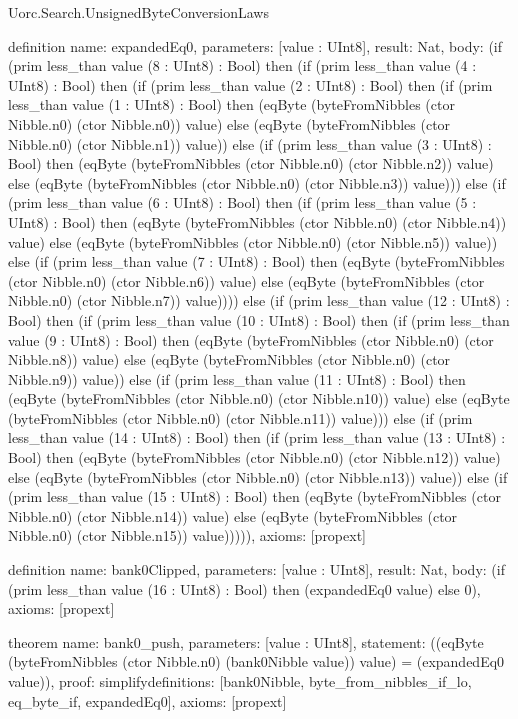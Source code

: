 \begin{lexlean}{Uorc.Search.UnsignedByteConversionLaws}
\begin{semanticmodule}
definition{
  name: expandedEq0,
  parameters: [value : UInt8],
  result: Nat,
  body: (if (prim less_than value (8 : UInt8) : Bool) then (if (prim less_than value (4 : UInt8) : Bool) then (if (prim less_than value (2 : UInt8) : Bool) then (if (prim less_than value (1 : UInt8) : Bool) then (eqByte (byteFromNibbles (ctor Nibble.n0) (ctor Nibble.n0)) value) else (eqByte (byteFromNibbles (ctor Nibble.n0) (ctor Nibble.n1)) value)) else (if (prim less_than value (3 : UInt8) : Bool) then (eqByte (byteFromNibbles (ctor Nibble.n0) (ctor Nibble.n2)) value) else (eqByte (byteFromNibbles (ctor Nibble.n0) (ctor Nibble.n3)) value))) else (if (prim less_than value (6 : UInt8) : Bool) then (if (prim less_than value (5 : UInt8) : Bool) then (eqByte (byteFromNibbles (ctor Nibble.n0) (ctor Nibble.n4)) value) else (eqByte (byteFromNibbles (ctor Nibble.n0) (ctor Nibble.n5)) value)) else (if (prim less_than value (7 : UInt8) : Bool) then (eqByte (byteFromNibbles (ctor Nibble.n0) (ctor Nibble.n6)) value) else (eqByte (byteFromNibbles (ctor Nibble.n0) (ctor Nibble.n7)) value)))) else (if (prim less_than value (12 : UInt8) : Bool) then (if (prim less_than value (10 : UInt8) : Bool) then (if (prim less_than value (9 : UInt8) : Bool) then (eqByte (byteFromNibbles (ctor Nibble.n0) (ctor Nibble.n8)) value) else (eqByte (byteFromNibbles (ctor Nibble.n0) (ctor Nibble.n9)) value)) else (if (prim less_than value (11 : UInt8) : Bool) then (eqByte (byteFromNibbles (ctor Nibble.n0) (ctor Nibble.n10)) value) else (eqByte (byteFromNibbles (ctor Nibble.n0) (ctor Nibble.n11)) value))) else (if (prim less_than value (14 : UInt8) : Bool) then (if (prim less_than value (13 : UInt8) : Bool) then (eqByte (byteFromNibbles (ctor Nibble.n0) (ctor Nibble.n12)) value) else (eqByte (byteFromNibbles (ctor Nibble.n0) (ctor Nibble.n13)) value)) else (if (prim less_than value (15 : UInt8) : Bool) then (eqByte (byteFromNibbles (ctor Nibble.n0) (ctor Nibble.n14)) value) else (eqByte (byteFromNibbles (ctor Nibble.n0) (ctor Nibble.n15)) value))))),
  axioms: [propext]
}

definition{
  name: bank0Clipped,
  parameters: [value : UInt8],
  result: Nat,
  body: (if (prim less_than value (16 : UInt8) : Bool) then (expandedEq0 value) else 0),
  axioms: [propext]
}

theorem{
  name: bank0_push,
  parameters: [value : UInt8],
  statement: ((eqByte (byteFromNibbles (ctor Nibble.n0) (bank0Nibble value)) value) = (expandedEq0 value)),
  proof: simplify{definitions: [bank0Nibble, byte_from_nibbles_if_lo, eq_byte_if, expandedEq0]},
  axioms: [propext]
}


\end{semanticmodule}
\end{lexlean}
